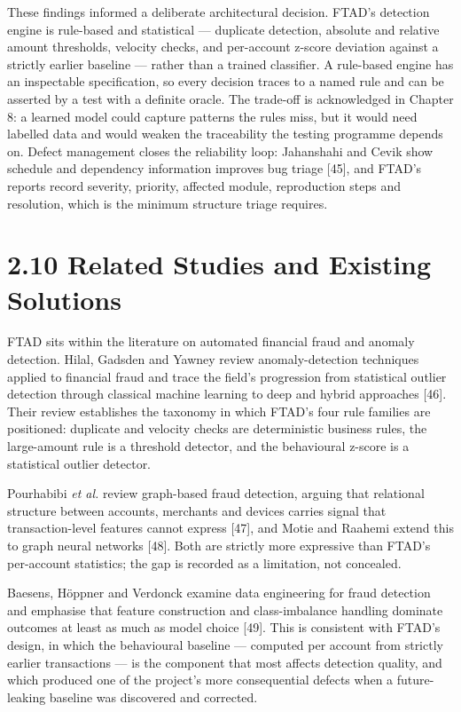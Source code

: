 \documentclass[
  12pt,
]{report}
\begin{document}
These findings informed a deliberate architectural decision. FTAD's
detection engine is rule-based and statistical --- duplicate detection,
absolute and relative amount thresholds, velocity checks, and
per-account z-score deviation against a strictly earlier baseline ---
rather than a trained classifier. A rule-based engine has an inspectable
specification, so every decision traces to a named rule and can be
asserted by a test with a definite oracle. The trade-off is acknowledged
in Chapter 8: a learned model could capture patterns the rules miss, but
it would need labelled data and would weaken the traceability the
testing programme depends on. Defect management closes the reliability
loop: Jahanshahi and Cevik show schedule and dependency information
improves bug triage {[}45{]}, and FTAD's reports record severity,
priority, affected module, reproduction steps and resolution, which is
the minimum structure triage requires.

\section{2.10 Related Studies and Existing
Solutions}\label{related-studies-and-existing-solutions}

FTAD sits within the literature on automated financial fraud and anomaly
detection. Hilal, Gadsden and Yawney review anomaly-detection techniques
applied to financial fraud and trace the field's progression from
statistical outlier detection through classical machine learning to deep
and hybrid approaches {[}46{]}. Their review establishes the taxonomy in
which FTAD's four rule families are positioned: duplicate and velocity
checks are deterministic business rules, the large-amount rule is a
threshold detector, and the behavioural z-score is a statistical outlier
detector.

Pourhabibi \emph{et al.} review graph-based fraud detection, arguing
that relational structure between accounts, merchants and devices
carries signal that transaction-level features cannot express {[}47{]},
and Motie and Raahemi extend this to graph neural networks {[}48{]}.
Both are strictly more expressive than FTAD's per-account statistics;
the gap is recorded as a limitation, not concealed.

Baesens, Höppner and Verdonck examine data engineering for fraud
detection and emphasise that feature construction and class-imbalance
handling dominate outcomes at least as much as model choice {[}49{]}.
This is consistent with FTAD's design, in which the behavioural baseline
--- computed per account from strictly earlier transactions --- is the
component that most affects detection quality, and which produced one of
the project's more consequential defects when a future-leaking baseline
was discovered and corrected.
\end{document}
